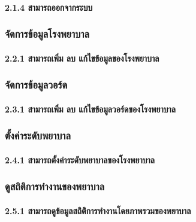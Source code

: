 \hspace{2.5cm}\paragraph{2.1.4 สามารถออกจากระบบ}

\hspace{1cm}\subsubsection{จัดการข้อมูลโรงพยาบาล}

\hspace{2.5cm}\paragraph{2.2.1 สามารถเพิ่ม ลบ แก้ไขข้อมูลของโรงพยาบาล}

\hspace{1cm}\subsubsection{จัดการข้อมูลวอร์ด}

\hspace{2.5cm}\paragraph{2.3.1 สามารถเพิ่ม ลบ แก้ไขข้อมูลวอร์ดของโรงพยาบาล}

\hspace{1cm}\subsubsection{ตั้งค่าระดับพยาบาล}

\hspace{2.5cm}\paragraph{2.4.1 สามารถตั้งค่าระดับพยาบาลของโรงพยาบาล}

\hspace{1cm}\subsubsection{ดูสถิติการทำงานของพยาบาล}

\hspace{2.5cm}\paragraph{2.5.1 สามารถดูข้อมูลสถิติการทำงานโดยภาพรวมของพยาบาล}

